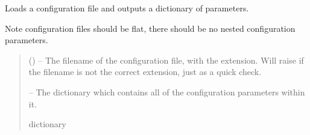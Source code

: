 \documentclass[letterpaper,11pt,english]{sphinxmanual}
\begin{document}
\begin{savenotes}\begin{fulllineitems}
\label{\detokenize{code/opihiexarata.library.config:opihiexarata.library.config.load_configuration_file}}
\pysigstartsignatures
{}
\pysigstopsignatures
\sphinxAtStartPar
Loads a configuration file and outputs a dictionary of parameters.

\sphinxAtStartPar
Note configuration files should be flat, there should be no nested
configuration parameters.
\begin{quote}\begin{description}
\sphinxAtStartPar
{} () – The filename of the configuration file, with the extension. Will raise
if the filename is not the correct extension, just as a quick check.

\sphinxAtStartPar
{} – The dictionary which contains all of the configuration parameters
within it.

\sphinxAtStartPar
dictionary

\end{description}\end{quote}

\end{fulllineitems}\end{savenotes}

\end{document}
